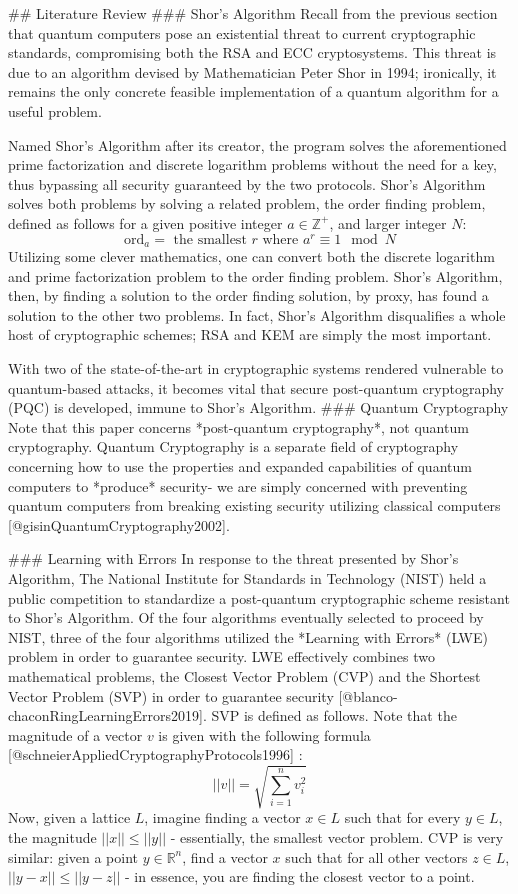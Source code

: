\documentclass[12pt]{article}
\begin{document}
## Literature Review
### Shor's Algorithm
Recall from the previous section that quantum computers pose an existential threat to current cryptographic standards, compromising both the RSA and ECC cryptosystems. This threat is due to an algorithm devised by Mathematician Peter Shor in 1994; ironically, it remains the only concrete feasible implementation of a quantum algorithm for a useful problem. 

Named Shor's Algorithm after its creator, the program solves the aforementioned prime factorization and discrete logarithm problems without the need for a key, thus bypassing all security guaranteed by the two protocols. Shor's Algorithm solves both problems by solving a related problem, the order finding problem, defined as follows for a given positive integer $a \in \mathbb{Z}^+$, and larger integer $N$: 
$$ \text{ord}_a = \text{ the smallest } r \text { where } a^r \equiv 1 \mod{N}$$
Utilizing some clever mathematics, one can convert both the discrete logarithm and prime factorization problem to the order finding problem. Shor's Algorithm, then, by finding a solution to the order finding solution, by proxy, has found a solution to the other two problems. In fact, Shor's Algorithm disqualifies a whole host of cryptographic schemes; RSA and KEM are simply the most important. 

With two of the state-of-the-art in cryptographic systems rendered vulnerable to quantum-based attacks, it becomes vital that secure post-quantum cryptography (PQC) is developed, immune to Shor's Algorithm. 
### Quantum Cryptography
Note that this paper concerns *post-quantum cryptography*, not quantum cryptography. Quantum Cryptography is a separate field of cryptography concerning how to use the properties and expanded capabilities of quantum computers to *produce* security- we are simply concerned with preventing quantum computers from breaking existing security utilizing classical computers [@gisinQuantumCryptography2002].

### Learning with Errors
In response to the threat presented by Shor's Algorithm, The National Institute for Standards in Technology (NIST) held a public competition to standardize a post-quantum cryptographic scheme resistant to Shor's Algorithm. Of the four algorithms eventually selected to proceed by NIST, three of the four algorithms utilized the *Learning with Errors* (LWE) problem in order to guarantee security. LWE effectively combines two mathematical problems, the Closest Vector Problem (CVP) and the Shortest Vector Problem (SVP) in order to guarantee security [@blanco-chaconRingLearningErrors2019]. SVP is defined as follows. Note that the magnitude of a vector $v$ is given with the following formula [@schneierAppliedCryptographyProtocols1996] : 
$$ || v || = \sqrt{\sum_{i = 1}^n v^2_i}$$
Now, given a lattice $L$, imagine finding a vector $x \in L$ such that for every $y \in L$, the magnitude $||x|| \leq ||y||$ - essentially, the smallest vector problem. CVP is very similar: given a point $y \in \mathbb{R}^n$, find a vector $x$ such that for all other vectors $z \in L$, $|| y - x || \leq || y - z||$ - in essence, you are finding the closest vector to a point. 
\end{document}
